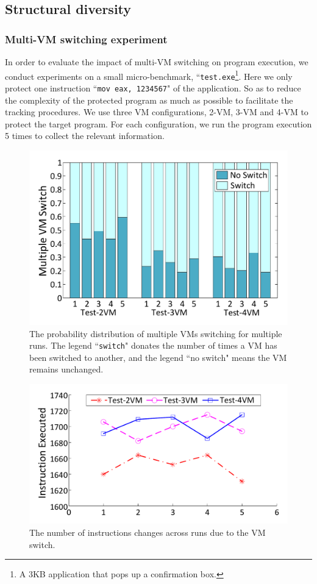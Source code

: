 \documentclass[preprint,12pt,3p]{elsarticle}
\begin{document}
\subsection{Structural diversity}\label{sec:s-d}
\subsubsection{Multi-VM switching experiment}
In order to evaluate the impact of multi-VM switching on program execution, we conduct experiments on
a small micro-benchmark, ``\texttt{test.exe}\footnote{A 3KB application that pops up a confirmation box.}. Here we only protect one instruction ``\texttt{mov eax, 1234567}" of the application.
So as to reduce the complexity of the protected program as much as possible to facilitate the tracking procedures.
We use three VM configurations, 2-VM, 3-VM and 4-VM to protect the target program.
For each configuration, we run the program execution 5 times to collect the relevant information.


\begin{figure}[t]
\centering
\centering
\includegraphics[width=.65\textwidth]{figure/testinfor.pdf}
\caption{The probability distribution of multiple VMs switching for multiple runs. The legend ``\texttt{switch}" donates the number of times a VM has been switched to another, and the legend ``no switch" means the VM remains unchanged.}\label{fig:Fig.testinfor}
\end{figure}

\begin{figure}[t]
\centering
\includegraphics[width=.65\textwidth]{figure/testinstr.pdf}
\caption{The number of instructions changes across runs due to the VM switch.} \label{fig:Fig.testinstr}
\end{figure}
\end{document}
